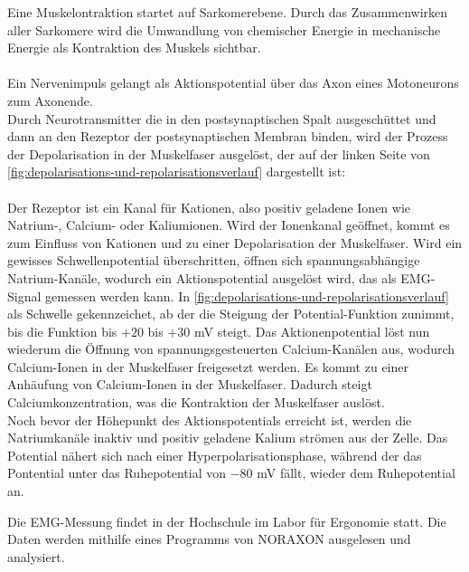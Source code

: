 Eine Muskelontraktion startet auf Sarkomerebene. Durch das Zusammenwirken aller Sarkomere wird die Umwandlung von chemischer Energie in mechanische Energie als Kontraktion des Muskels sichtbar.\\
\\
Ein  Nervenimpuls gelangt als Aktionspotential über das Axon eines Motoneurons zum Axonende. \\
Durch Neurotransmitter die in den postsynaptischen Spalt ausgeschüttet und dann an den Rezeptor der postsynaptischen Membran binden, wird der Prozess der Depolarisation in der Muskelfaser ausgelöst, der auf der linken Seite von  \autoref{fig:depolarisations-und-repolarisationsverlauf} dargestellt ist:\\
\\
Der Rezeptor ist ein Kanal für Kationen, also positiv geladene Ionen wie Natrium-, Calcium- oder Kaliumionen. Wird der Ionenkanal geöffnet, kommt es zum Einfluss von Kationen und zu einer  Depolarisation der Muskelfaser. Wird ein gewisses Schwellenpotential überschritten, öffnen sich spannungsabhängige Natrium-Kanäle, wodurch ein Aktionspotential ausgelöst wird, das als EMG-Signal gemessen werden kann. In \autoref{fig:depolarisations-und-repolarisationsverlauf} als Schwelle gekennzeichet, ab der die Steigung der Potential-Funktion zunimmt, bis die Funktion bis $+20$ bis $+30$ mV steigt.
Das Aktionenpotential löst nun wiederum die Öffnung von spannungsgesteuerten Calcium-Kanälen aus, wodurch Calcium-Ionen in der Muskelfaser freigesetzt werden. Es kommt zu einer Anhäufung von Calcium-Ionen in der Muskelfaser. Dadurch steigt Calciumkonzentration, was die Kontraktion der Muskelfaser auslöst. \\
Noch bevor der Höhepunkt des Aktionspotentials erreicht ist, werden die Natriumkanäle inaktiv und positiv geladene Kalium strömen aus der Zelle. Das Potential nähert sich nach einer Hyperpolarisationsphase, während der das Pontential unter das Ruhepotential von $-80$ mV fällt, wieder dem Ruhepotential an.

Die EMG-Messung findet in der Hochschule im Labor für Ergonomie statt. Die Daten werden mithilfe eines Programms von NORAXON ausgelesen und analysiert.


